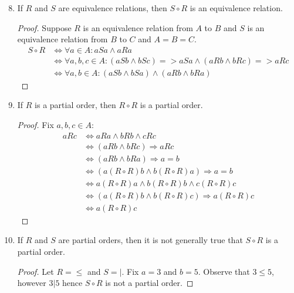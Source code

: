\documentclass{article}
\begin{document}
  \begin{enumerate} \setcounter{enumi}{7}
    \item If $R$ and $S$ are equivalence relations, then $S \circ R$ is an equivalence relation.
      \begin{proof}
        Suppose $R$ is an equivalence relation from $A$ to $B$ and $S$ is an equivalence relation from $B$ to $C$ and $A = B = C$.
        \begin{align*}
          S \circ R &\iff \forall a\in A : aSa \wedge aRa \\
          &\iff \forall a,b,c\in A: (aSb \wedge bSc) => aSa \wedge (aRb \wedge bRc) => aRc \\
            &\iff \forall a,b\in A: (aSb \wedge bSa) \wedge (aRb \wedge bRa) 
        \end{align*}
      \end{proof}
    \item If $R$ is a partial order, then $R \circ R$ is a partial order.
      \begin{proof}
        Fix $a,b,c\in A$:
        \begin{align*}
          aRc &\iff aRa \wedge bRb \wedge cRc \\
            &\iff (aRb \wedge bRc) \Rightarrow aRc \\
            &\iff (aRb \wedge bRa) \Rightarrow a = b \\
            &\iff (a(R \circ R)b \wedge b(R \circ R)a) \Rightarrow a = b \\
            &\iff a(R \circ R)a \wedge b(R \circ R)b \wedge c(R \circ R)c \\
            &\iff (a(R \circ R)b \wedge b(R \circ R)c) \Rightarrow a(R \circ R)c \\ 
            &\iff a(R \circ R)c
        \end{align*}
      \end{proof}
    \item If $R$ and $S$ are partial orders, then it is not generally true that $S \circ R$ is a partial order.
      \begin{proof}
        Let $R = \le$ and $S = |$. Fix $a = 3$ and $b = 5$. Observe that $3 \le 5$, however $3 | 5$ hence $S \circ R$ is not a partial order.
      \end{proof}
  \end{enumerate}
\end{document}
